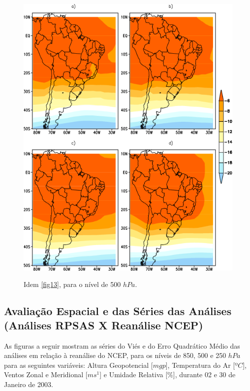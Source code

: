 \begin{figure}[!hbp]
\centering
\includegraphics[height=15cm]{./figs/media_temp_anl_500hPa.png}
\caption{Idem \autoref{fig13}, para o nível de 500 $hPa$.}
\label{fig21}
\end{figure}







\subsection{Avaliação Espacial e das Séries das Análises (Análises RPSAS X Reanálise NCEP)}
\label{ss:avalesanl}

As figuras a seguir mostram as séries do Viés e do Erro Quadrático Médio das análises em relação à reanálise do NCEP, para os níveis de 850, 500 e 250 $hPa$ para as seguintes variáveis: Altura Geopotencial [$mgp$], Temperatura do Ar [$ºC$], Ventos Zonal e Meridional [$ms^{1}$] e Umidade Relativa [$\%$], durante 02 e 30 de Janeiro de 2003.

